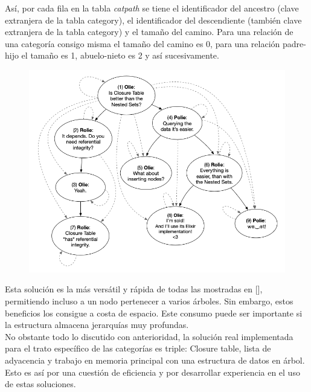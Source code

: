 \documentclass[a4paper]{report}
\begin{document}
    Así, por cada fila en la tabla \emph{catpath} se tiene el identificador del ancestro (clave extranjera de la tabla category), el identificador del descendiente (también clave extranjera de la tabla category) y el tamaño del camino. Para una relación de una categoría consigo misma el tamaño del camino es 0, para una relación padre-hijo el tamaño es 1, abuelo-nieto es 2 y así sucesivamente.
    
    \begin{figure}[t]
    	\centering
    	\includegraphics[width=\textwidth]{closure_table}
    \end{figure}
    
    Esta solución es la más versátil y rápida de todas las mostradas en [], permitiendo incluso a un nodo pertenecer a varios árboles. Sin embargo, estos beneficios los consigue a costa de espacio. Este consumo puede ser importante si la estructura almacena jerarquías muy profundas.
    \\
    
    No obstante todo lo discutido con anterioridad, la solución real implementada para el trato específico de las categorías es triple: Closure table, lista de adyacencia y trabajo en memoria principal con una estructura de datos en árbol. Esto es así por una cuestión de eficiencia y por desarrollar experiencia en el uso de estas soluciones.
    \\
    
\end{document}
